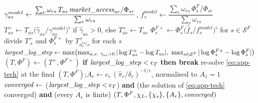 \begin{algorithm}[H]
\begin{algorithmic}[1]
    \State $\gamma^{model}_{as}\gets\dfrac{\sum_r\omega_{rs}\,T_{as}\,\mathit{market\_access}_{ar}/\Phi_{sr}}{\sum_r\omega_{rs}}$,\quad
      $f^{model}_{s}\gets\dfrac{\sum_r\omega_{rs}\,\Phi^F_s/\Phi_{sr}}{\sum_r\omega_{rs}}$
    \State $T^{+}_{as}\gets T_{as}\bigl(\hat\gamma_{as}/\gamma^{model}_{as}\bigr)^{\varsigma}$ if $\hat\gamma_{as}>0$, else $T^{+}_{as}\gets T_{as}$
    \State $\Phi^{F+}_{s}\gets \Phi^{F}_{s}\bigl(\hat f_{s}/f^{model}_{s}\bigr)^{\varsigma}$ for $s\in\mathcal{S}^F$
    \State divide $T^{+}_{\cdot s}$ and $\Phi^{F+}_s$ by $T^{+}_{a^{ref}_s s}$ for each $s$
    \State $\var{largest\_log\_step}\gets\max\bigl(\max_{a,s:\ \hat\gamma_{as}>0}|\log T^{+}_{as}-\log T_{as}|,\ \max_{s\in\mathcal{S}^F}|\log \Phi^{F+}_{s}-\log \Phi^F_{s}|\bigr)$
    \State $(T,\Phi^F)\gets(T^{+},\Phi^{F+})$
    \State \textbf{if} $\mathit{largest\_log\_step}<\epsilon_T$ \textbf{then break}
\EndFor
{}
\State re-solve \eqref{eq:app-tech} at the final $(T,\Phi^F)$;\quad $A_r\gets c_r\,(\hat\pi_r/\delta_r)^{-1/\varepsilon}$, normalised to $A_1=1$
\State $\mathit{converged}\gets$ ($\mathit{largest\_log\_step}<\epsilon_T$) \textbf{and} (the solution of \eqref{eq:app-tech} converged) \textbf{and} (every $A_r$ is finite)
\State \Return $(T,\Phi^F,\chi_L,\{\chi_s\},\{A_r\},\mathit{converged})$
\end{algorithmic}
\end{algorithm}

